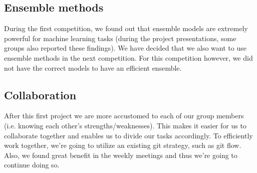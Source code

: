 \documentclass[10pt, a4paper]{article}
\begin{document}
\begin{multicols}{2}
\begin{minipage}{\linewidth}
    	\subsection{Ensemble methods}
		During the first competition, we found out that ensemble models are extremely powerful for machine learning tasks (during the project presentations, some groups also reported these findings). We have decided that we also want to use ensemble methods in the next competition. For this competition however, we did not have the correct models to have an efficient ensemble.
		\subsection{Collaboration}
		After this first project we are more accustomed to each of our group members (i.e. knowing each other's strengths/weaknesses). This makes it easier for us to collaborate together and enables us to divide our tasks accordingly. To efficiently work together, we're going to utilize an existing git strategy, such as git flow. Also, we found great benefit in the weekly meetings and thus we're going to continue doing so.
	    
	
	
	\end{minipage}
	\end{multicols}
	
\end{document}
